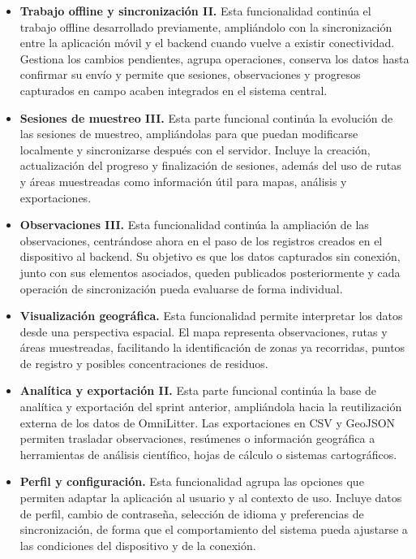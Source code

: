 \begin{itemize}[leftmargin=1.4em]
\item \textbf{Trabajo offline y sincronización II.} Esta funcionalidad continúa el trabajo offline desarrollado previamente, ampliándolo con la sincronización entre la aplicación móvil y el backend cuando vuelve a existir conectividad. Gestiona los cambios pendientes, agrupa operaciones, conserva los datos hasta confirmar su envío y permite que sesiones, observaciones y progresos capturados en campo acaben integrados en el sistema central.
\item \textbf{Sesiones de muestreo III.} Esta parte funcional continúa la evolución de las sesiones de muestreo, ampliándolas para que puedan modificarse localmente y sincronizarse después con el servidor. Incluye la creación, actualización del progreso y finalización de sesiones, además del uso de rutas y áreas muestreadas como información útil para mapas, análisis y exportaciones.
\item \textbf{Observaciones III.} Esta funcionalidad continúa la ampliación de las observaciones, centrándose ahora en el paso de los registros creados en el dispositivo al backend. Su objetivo es que los datos capturados sin conexión, junto con sus elementos asociados, queden publicados posteriormente y cada operación de sincronización pueda evaluarse de forma individual.
\item \textbf{Visualización geográfica.} Esta funcionalidad permite interpretar los datos desde una perspectiva espacial. El mapa representa observaciones, rutas y áreas muestreadas, facilitando la identificación de zonas ya recorridas, puntos de registro y posibles concentraciones de residuos.
\item \textbf{Analítica y exportación II.} Esta parte funcional continúa la base de analítica y exportación del sprint anterior, ampliándola hacia la reutilización externa de los datos de OmniLitter. Las exportaciones en CSV y GeoJSON permiten trasladar observaciones, resúmenes o información geográfica a herramientas de análisis científico, hojas de cálculo o sistemas cartográficos.
\item \textbf{Perfil y configuración.} Esta funcionalidad agrupa las opciones que permiten adaptar la aplicación al usuario y al contexto de uso. Incluye datos de perfil, cambio de contraseña, selección de idioma y preferencias de sincronización, de forma que el comportamiento del sistema pueda ajustarse a las condiciones del dispositivo y de la conexión.
\end{itemize}

